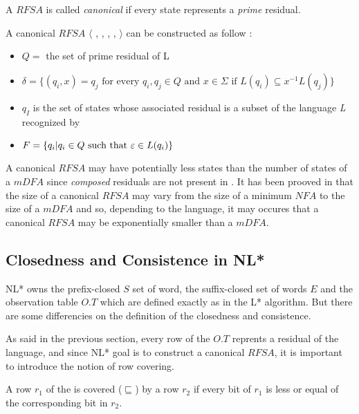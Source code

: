 \begin{definition}
  A $RFSA$ is called \textit{canonical} if every state represents a \textit{prime} residual.
\end{definition}

A canonical $RFSA$ $\langle$ \alphabet{}, \states{}, \transition{}, \qzero{}, \qend{} $\rangle$ can be constructed as follow :
\begin{itemize}
  \item $Q = $ the set of prime residual of L
  \item $\delta = \{(q_i, x) = q_j \text{ for every } q_i, q_j \in Q \text{ and } x \in \Sigma \text{ if } L(q_i) \subseteq x^{-1}L(q_j)\}$
  \item $q_I$ is the set of states whose associated residual is a subset of the language \textit{L} recognized by \automaton{}
  \item $F = \{q_i | q_i \in Q \text{ such that } \varepsilon \in L(q_i)\}$
\end{itemize}

A canonical $RFSA$ \automaton{} may have potentially less states than the number of states of a $mDFA$ since \textit{composed} residuals are not present in  \automaton{}. It has been prooved in  \cite{RFSA} that the size of a canonical $RFSA$ may vary from the size of a minimum $NFA$ to the size of a $mDFA$ and so, depending to the language, it may occures that a canonical $RFSA$ may be exponentially smaller than a $mDFA$.

\subsection{Closedness and Consistence in NL*}

NL* owns the prefix-closed $S$ set of word, the suffix-closed set of words $E$ and the observation table $O.T$ which are defined exactly as in the L* algorithm. But there are some differencies on the definition of the closedness and consistence.

As said in the previous section, every row of the $O.T$ reprents a residual of the language, and since NL* goal is to construct a canonical $RFSA$, it is important to introduce the notion of row covering.

\begin{definition}
  \label{def:row-covering}
  A row $r_1$ of the \OT is covered ($\sqsubseteq$) by a row $r_2$ if every bit of $r_1$ is less or equal of the corresponding bit in $r_2$.
\end{definition}

